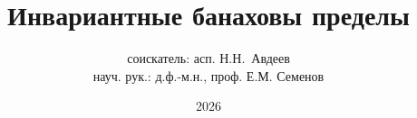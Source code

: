 

\title{
	Инвариантные банаховы пределы
}
\author{соискатель: асп. Н.Н.~Авдеев\\науч. рук.: д.ф.-м.н., проф. Е.М. Семенов}
\date{2026}

\maketitle

